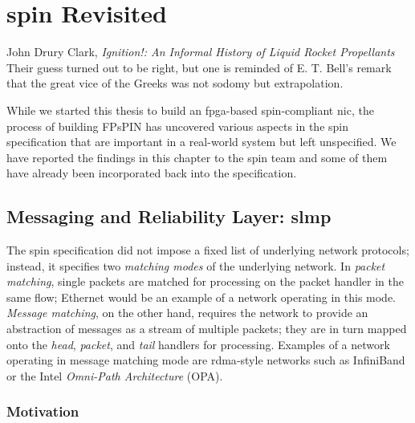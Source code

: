 \chapter{\acs{spin} Revisited} \label{chap:spin-revisited}
\begin{chapquote}{John Drury Clark, \textit{Ignition!: An Informal History of Liquid Rocket Propellants}}
Their guess turned out to be right, but one is reminded of E. T. Bell's remark that the great vice of the Greeks was not sodomy but extrapolation.
\end{chapquote}

While we started this thesis to build an \ac{fpga}-based \ac{spin}-compliant \ac{nic}, the process of building FPsPIN has uncovered various aspects in the \ac{spin} specification that are important in a real-world system but left unspecified.  We have reported the findings in this chapter to the \ac{spin} team and some of them have already been incorporated back into the specification.

\section{Messaging and Reliability Layer: \acs{slmp}} \label{sec:slmp}

The \ac{spin} specification did not impose a fixed list of underlying network protocols; instead, it specifies two \emph{matching modes} of the underlying network.  In \emph{packet matching}, single packets are matched for processing on the packet handler in the same flow; Ethernet would be an example of a network operating in this mode.  \emph{Message matching}, on the other hand, requires the network to provide an abstraction of messages as a stream of multiple packets; they are in turn mapped onto the \emph{head}, \emph{packet}, and \emph{tail} handlers for processing.  Examples of a network operating in message matching mode are \ac{rdma}-style networks such as InfiniBand or the Intel \emph{Omni-Path Architecture} (OPA).

\subsection{Motivation}

